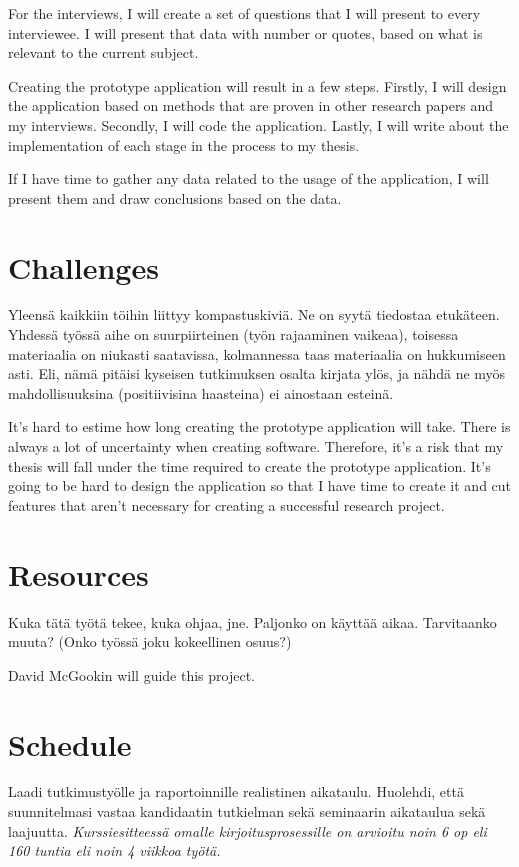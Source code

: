 \documentclass[12pt,a4paper,finnish,oneside]{article}
\begin{document}
For the interviews, I will create a set of questions that I will present to
every interviewee. I will present that data with number or quotes, based on
what is relevant to the current subject.

Creating the prototype application will result in a few steps. Firstly,
I will design the application based on methods that are proven in other research
papers and my interviews. Secondly, I will code the application. Lastly, I will
write about the implementation of each stage in the process to my thesis.

If I have time to gather any data related to the usage of the application,
I will present them and draw conclusions based on the data.


\section{Challenges}

Yleensä kaikkiin töihin liittyy kompastuskiviä. Ne on syytä tiedostaa
etukäteen. Yhdessä työssä aihe on suurpiirteinen (työn rajaaminen
vaikeaa), toisessa materiaalia on niukasti saatavissa, kolmannessa
taas materiaalia on hukkumiseen asti.  Eli, nämä pitäisi kyseisen
tutkimuksen osalta kirjata ylös, ja nähdä ne myös mahdollisuuksina
(positiivisina haasteina) ei ainostaan esteinä.

It's hard to estime how long creating the prototype application will take.
There is always a lot of uncertainty when creating software. Therefore, it's
a risk that my thesis will fall under the time required to create the prototype
application. It's going to be hard to design the application so that I have
time to create it and cut features that aren't necessary for creating a
successful research project.

\section{Resources}

Kuka tätä työtä tekee, kuka ohjaa, jne. Paljonko on käyttää
aikaa. Tarvitaanko muuta? (Onko työssä joku kokeellinen osuus?)

David McGookin will guide this project.

\section{Schedule}

Laadi tutkimustyölle ja raportoinnille realistinen aikataulu.
Huolehdi, että suunnitelmasi vastaa kandidaatin tutkielman sekä
seminaarin aikataulua sekä laajuutta.  \emph{Kurssiesitteessä omalle
  kirjoitusprosessille on arvioitu noin 6 op eli 160 tuntia eli noin 4
  viikkoa työtä.}
\end{document}
